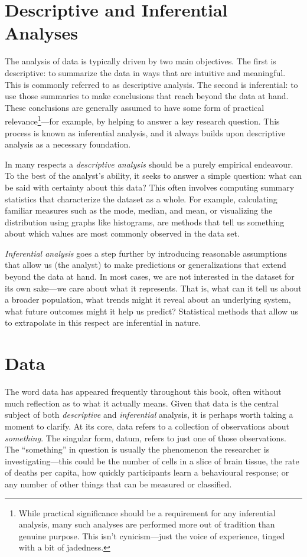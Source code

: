 \section{Descriptive and Inferential Analyses}

The analysis of data is typically driven by two main objectives. The first is descriptive: to summarize the data in ways that are intuitive and meaningful. This is commonly referred to as \gls{descriptive analysis}. The second is inferential: to use those summaries to make conclusions that reach beyond the data at hand. These conclusions are generally assumed to have some form of practical relevance\footnote{While practical significance should be a requirement for any inferential analysis, many such analyses are performed more out of tradition than genuine purpose. This isn't cynicism—just the voice of experience, tinged with a bit of jadedness.}—for example, by helping to answer a key research question. This process is known as \gls{inferential analysis}, and it always builds upon descriptive analysis as a necessary foundation.

In many respects a \textit{descriptive analysis} should be a purely empirical endeavour. To the best of the analyst’s ability, it seeks to answer a simple question: what can be said with certainty about this data? This often involves computing summary statistics that characterize the dataset as a whole. For example, calculating familiar measures such as the mode, median, and mean, or visualizing the distribution using graphs like histograms, are methods that tell us something about which values are most commonly observed in the data set.

\textit{Inferential analysis} goes a step further by introducing reasonable assumptions that allow us (the analyst) to make predictions or generalizations that extend beyond the data at hand. In most cases, we are not interested in the dataset for its own sake—we care about what it represents. That is, what can it tell us about a broader population, what trends might it reveal about an underlying system, what future outcomes might it help us predict? Statistical methods that allow us to extrapolate in this respect are inferential in nature.

\section{Data}

The word data has appeared frequently throughout this book, often without much reflection as to what it actually means. Given that data is the central subject of both \textit{descriptive} and \textit{inferential} analysis, it is perhaps worth taking a moment to clarify. At its core, \gls{data} refers to a collection of observations about \textit{something}. The singular form, \gls{datum}, refers to just one of those observations. The ``something'' in question is usually the phenomenon the researcher is investigating—this could be the number of cells in a slice of brain tissue, the rate of deaths per capita, how quickly participants learn a behavioural response; or any number of other things that can be measured or classified. 

